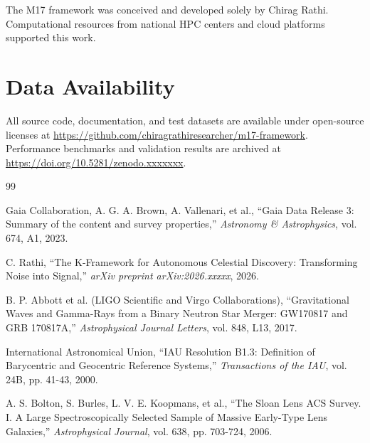 \documentclass[twocolumn]{article}
\begin{document}
The M17 framework was conceived and developed solely by Chirag Rathi. Computational resources from national HPC centers and cloud platforms supported this work.

\section*{Data Availability}

All source code, documentation, and test datasets are available under open-source licenses at \url{https://github.com/chiragrathiresearcher/m17-framework}. Performance benchmarks and validation results are archived at \url{https://doi.org/10.5281/zenodo.xxxxxxx}.


\begin{thebibliography}{99}

Gaia Collaboration, A. G. A. Brown, A. Vallenari, et al.,
``Gaia Data Release 3: Summary of the content and survey properties,''
\textit{Astronomy \& Astrophysics}, vol. 674, A1, 2023.

C. Rathi,
``The K-Framework for Autonomous Celestial Discovery: Transforming Noise into Signal,''
\textit{arXiv preprint arXiv:2026.xxxxx}, 2026.

B. P. Abbott et al. (LIGO Scientific and Virgo Collaborations),
``Gravitational Waves and Gamma-Rays from a Binary Neutron Star Merger: GW170817 and GRB 170817A,''
\textit{Astrophysical Journal Letters}, vol. 848, L13, 2017.

International Astronomical Union,
``IAU Resolution B1.3: Definition of Barycentric and Geocentric Reference Systems,''
\textit{Transactions of the IAU}, vol. 24B, pp. 41-43, 2000.

A. S. Bolton, S. Burles, L. V. E. Koopmans, et al.,
``The Sloan Lens ACS Survey. I. A Large Spectroscopically Selected Sample of Massive Early-Type Lens Galaxies,''
\textit{Astrophysical Journal}, vol. 638, pp. 703-724, 2006.

\end{thebibliography}
\end{document}
